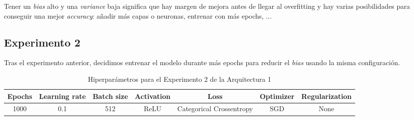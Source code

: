 \documentclass{article}
\begin{document}
			Tener un \textit{bias} alto y una \textit{variance} baja significa que hay margen de mejora antes de llegar al overfitting y hay varias posibilidades para conseguir una mejor \textit{accuracy}: a\~nadir m\'as capas o neuronas, entrenar con m\'as epochs, ...
		
		\subsection{Experimento 2}
		\label{s-a1-e2}
			Tras el experimento anterior, decidimos entrenar el modelo durante m\'as epochs para reducir el \textit{bias} usando la misma configuraci\'on.\\
			\begin{table}[h]
				\begin{center}
					\begin{tabular}{| c | c | c | c | c | c | c |}
						\textbf{Epochs} & \textbf{Learning rate} & \textbf{Batch size} & \textbf{Activation} & \textbf{Loss} & \textbf{Optimizer} & \textbf{Regularization} \\ \hline
						1000 & 0.1 & 512 & ReLU & Categorical Crossentropy & SGD & None
					\end{tabular}
					\caption{Hiperpar\'ametros para el Experimento 2 de la Arquitectura 1}
					\label{tab:hip-a1-e2}
				\end{center}
			\end{table}
			
\end{document}

